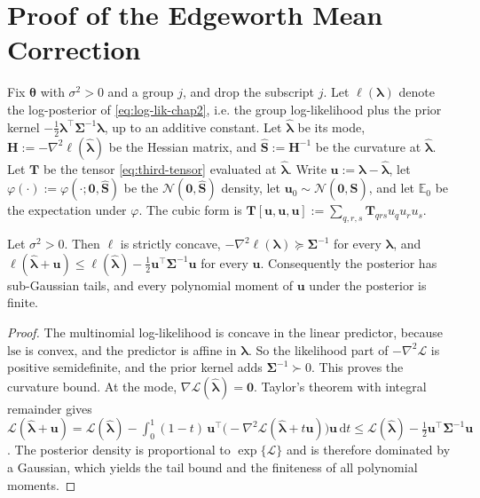 \section{Proof of the Edgeworth Mean Correction}
\label{app:edgeworth-proof}

Fix $\bm{\theta}$ with $\sigma^{2}>0$ and a group $j$, and drop the subscript $j$. Let $\ell(\bm{\lambda})$ denote the log-posterior of \eqref{eq:log-lik-chap2}, i.e. the group log-likelihood plus the prior kernel $-\frac{1}{2}\bm{\lambda}^{\top}\bm{\Sigma}^{-1}\bm{\lambda}$, up to an additive constant. Let $\hat{\bm{\lambda}}$ be its mode, $\mathbf{H}:=-\nabla^{2}\ell(\hat{\bm{\lambda}})$ be the Hessian matrix, and $\hat{\mathbf{S}}:=\mathbf{H}^{-1}$ be the curvature at $\bm{\hat{\bm{\lambda}}}$. Let $\mathbf{T}$ be the tensor \eqref{eq:third-tensor} evaluated at $\hat{\bm{\lambda}}$. Write $\bm{u}:=\bm{\lambda}-\hat{\bm{\lambda}}$, let $\varphi(\cdot):=\varphi(\cdot;\bm{0},\hat{\mathbf{S}})$ be the $\mathcal{N}(\bm{0},\hat{\mathbf{S}})$ density, let $\bm{u}_{0}\sim\mathcal{N}(\bm{0},\hat{\mathbf{S}})$, and let $\mathbb{E}_{0}$ be the expectation under $\varphi$. The cubic form is $\mathbf{T}[\bm{u},\bm{u},\bm{u}]:=\sum_{q,r,s}\mathbf{T}_{qrs}u_{q}u_{r}u_{s}$.

\begin{lemma}
Let $\sigma^{2}>0$. Then $\ell$ is strictly concave, $-\nabla^{2}\ell(\bm{\lambda})\succeq\bm{\Sigma}^{-1}$ for every $\bm{\lambda}$, and $\ell(\hat{\bm{\lambda}}+\bm{u})\leq\ell(\hat{\bm{\lambda}})-\frac{1}{2}\bm{u}^{\top}\bm{\Sigma}^{-1}\bm{u}$ for every $\bm{u}$. Consequently the posterior has sub-Gaussian tails, and every polynomial moment of $\bm{u}$ under the posterior is finite.
\label{lem:posterior-tails}
\end{lemma}

\begin{proof}
The multinomial log-likelihood is concave in the linear predictor, because $\mathrm{lse}$ is convex, and the predictor is affine in $\bm{\lambda}$. So the likelihood part of $-\nabla^{2}\mathcal{L}$ is positive semidefinite, and the prior kernel adds $\bm{\Sigma}^{-1}\succ0$. This proves the curvature bound. At the mode, $\nabla\mathcal{L}(\hat{\bm{\lambda}})=\bm{0}$. Taylor's theorem with integral remainder gives $\mathcal{L}(\hat{\bm{\lambda}}+\bm{u})=\mathcal{L}(\hat{\bm{\lambda}})-\int_{0}^{1}(1-t)\,\bm{u}^{\top}\big(-\nabla^{2}\mathcal{L}(\hat{\bm{\lambda}}+t\bm{u})\big)\bm{u}\,\mathrm{d}t\leq\mathcal{L}(\hat{\bm{\lambda}})-\frac{1}{2}\bm{u}^{\top}\bm{\Sigma}^{-1}\bm{u}$. The posterior density is proportional to $\exp\{\mathcal{L}\}$ and is therefore dominated by a Gaussian, which yields the tail bound and the finiteness of all polynomial moments.
\end{proof}

